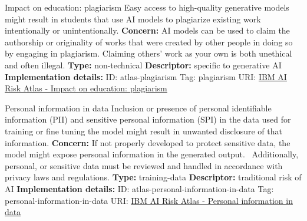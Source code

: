 \documentclass[a4paper,12pt]{article}
\begin{document}
\begin{definitionbox}{Impact on education: plagiarism}
Easy access to high-quality generative models might result in students that use AI models to plagiarize existing work intentionally or unintentionally.\newline\newline
\textbf{Concern: }AI models can be used to claim the authorship or originality of works that were created by other people in doing so by engaging in plagiarism. Claiming others' work as your own is both unethical and often illegal.\newline\newline
\textbf{Type: }non-technical\newline
\textbf{Descriptor: }specific to generative AI \newline\newline
\textbf{Implementation details: } \newline
ID: atlas-plagiarism \newline
Tag: plagiarism \newline
URI:  \href{https://www.ibm.com/docs/en/watsonx/saas?topic=SSYOK8/wsj/ai-risk-atlas/plagiarism.html}{IBM AI Risk Atlas - Impact on education: plagiarism}\newline
\end{definitionbox}
\begin{definitionbox}{Personal information in data}
Inclusion or presence of personal identifiable information (PII) and sensitive personal information (SPI) in the data used for training or fine tuning the model might result in unwanted disclosure of that information.\newline\newline
\textbf{Concern: }If not properly developed to protect sensitive data, the model might expose personal information in the generated output.  Additionally, personal, or sensitive data must be reviewed and handled in accordance with privacy laws and regulations.\newline\newline
\textbf{Type: }training-data\newline
\textbf{Descriptor: }traditional risk of AI \newline\newline
\textbf{Implementation details: } \newline
ID: atlas-personal-information-in-data \newline
Tag: personal-information-in-data \newline
URI:  \href{https://www.ibm.com/docs/en/watsonx/saas?topic=SSYOK8/wsj/ai-risk-atlas/personal-information-in-data.html}{IBM AI Risk Atlas - Personal information in data}\newline
\end{definitionbox}
\end{document}

